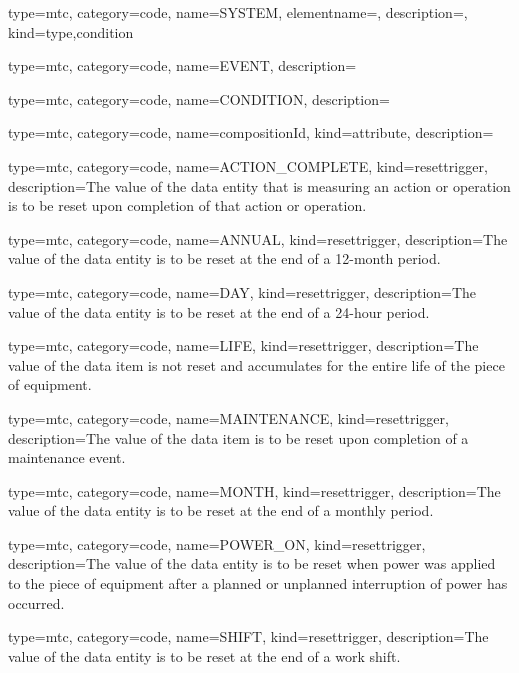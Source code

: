 {
  type=mtc,
  category=code,
  name={SYSTEM},
  elementname=,
  description={},
  kind={type,condition}
}


{
  type=mtc,
  category=code,
  name={EVENT},
  description={}
}


{
  type=mtc,
  category=code,
  name={CONDITION},
  description={}
}


{
  type=mtc,
  category=code,
  name={compositionId},
  kind={attribute},
  description={}
}


{
  type=mtc,
  category=code,
  name={ACTION\_COMPLETE},
  kind={resettrigger},
  description={The value of the \gls{data entity} that is measuring an action or operation is to be reset upon completion of that action or operation.}
}


{
  type=mtc,
  category=code,
  name={ANNUAL},
  kind={resettrigger},
  description={The value of the \gls{data entity} is to be reset at the end of a 12-month period.}
}


{
  type=mtc,
  category=code,
  name={DAY},
  kind={resettrigger},
  description={The value of the \gls{data entity} is to be reset at the end of a 24-hour period.}
}


{
  type=mtc,
  category=code,
  name={LIFE},
  kind={resettrigger},
  description={The value of the data item is not reset and accumulates for the entire life of the piece of equipment.}
}


{
  type=mtc,
  category=code,
  name={MAINTENANCE},
  kind={resettrigger},
  description={The value of the data item is to be reset upon completion of a maintenance event.}
}


{
  type=mtc,
  category=code,
  name={MONTH},
  kind={resettrigger},
  description={The value of the \gls{data entity} is to be reset at the end of a monthly period.}
}


{
  type=mtc,
  category=code,
  name={POWER\_ON},
  kind={resettrigger},
  description={The value of the \gls{data entity} is to be reset when power was applied to the piece of equipment after a planned or unplanned interruption of power has occurred.}
}


{
  type=mtc,
  category=code,
  name={SHIFT},
  kind={resettrigger},
  description={The value of the \gls{data entity} is to be reset at the end of a work shift.}
}


